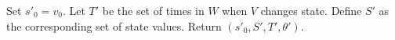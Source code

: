 \begin{algorithm}[H]
\begin{algorithmic}[1]
    \vspace{-.1in}
    \State Set $s'_0=v_0$. Let $T'$ be the set of times in $W$ when $V$ changes state. Define $S'$ as the corresponding set of state values. Return $(s'_0, S', T', \theta')$.
\end{algorithmic}
\end{algorithm}

